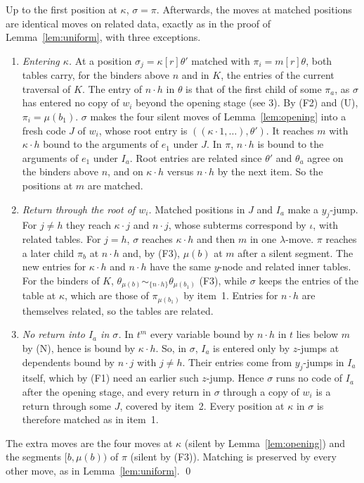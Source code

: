 \documentclass[11pt]{article}
\newcommand{\suc}[2]{#1{\cdot}#2}
\theoremstyle{plain}
\theoremstyle{definition}
\theoremstyle{remark}
\begin{document}
Up to the first position at $\kappa$, $\sigma=\pi$.  Afterwards, the
moves at matched positions are identical moves on related data, exactly
as in the proof of Lemma~\ref{lem:uniform}, with three exceptions.
\begin{enumerate}
\item \emph{Entering $\kappa$.}  At a position $\sigma_j=\kappa[r]\theta'$
  matched with $\pi_i=m[r]\theta$, both tables carry, for the binders
  above $n$ and in $K$, the entries of the current traversal of $K$.  The
  entry of $\suc nh$ in $\theta$ is that of the first child of some
  $\pi_a$, as $\sigma$ has entered no copy of $w_i$ beyond the opening
  stage (see 3).  By (F2) and (U), $\pi_i=\mu(b_1)$.  $\sigma$ makes the
  four silent moves of Lemma~\ref{lem:opening} into a fresh code $J$ of
  $w_i$, whose root entry is $((\suc\kappa1,\dots),\theta')$.  It
  reaches $m$ with $\suc\kappa h$ bound to the arguments of $e_1$ under
  $J$.  In $\pi$, $\suc nh$ is bound to the arguments of $e_1$ under
  $I_a$.  Root entries are related since $\theta'$ and $\theta_a$ agree on
  the binders above $n$, and on $\suc\kappa h$ versus $\suc nh$ by the
  next item.  So the positions at $m$ are matched.
\item \emph{Return through the root of $w_i$.}  Matched positions in $J$
  and $I_a$ make a $y_j$-jump.  For $j\ne h$ they reach $\suc\kappa j$ and
  $\suc nj$, whose subterms correspond by $\iota$, with related tables.
  For $j=h$, $\sigma$ reaches $\suc\kappa h$ and then $m$ in one
  $\lambda$-move.  $\pi$ reaches a later child $\pi_b$ at $\suc nh$ and,
  by (F3), $\mu(b)$ at $m$ after a silent segment.  The new entries for
  $\suc\kappa h$ and $\suc nh$ have the same $y$-node and related inner
  tables.  For the binders of $K$, $\theta_{\mu(b)}\sim_{\{\suc
  nh\}}\theta_{\mu(b_1)}$ (F3), while $\sigma$ keeps the entries of the
  table at $\kappa$, which are those of $\pi_{\mu(b_1)}$ by item~1.
  Entries for $\suc nh$ are themselves related, so the tables are
  related.
\item \emph{No return into $I_a$ in $\sigma$.}  In $t^m$ every variable
  bound by $\suc nh$ in $t$ lies below $m$ by (N), hence is bound by
  $\suc\kappa h$.  So, in $\sigma$, $I_a$ is entered only by $z$-jumps at
  dependents bound by $\suc nj$ with $j\ne h$.  Their entries come from
  $y_j$-jumps in $I_a$ itself, which by (F1) need an earlier such
  $z$-jump.  Hence $\sigma$ runs no code of $I_a$ after the opening
  stage, and every return in $\sigma$ through a copy of $w_i$ is a return
  through some $J$, covered by item~2.  Every position at $\kappa$ in
  $\sigma$ is therefore matched as in item~1.
\end{enumerate}
The extra moves are the four moves at $\kappa$ (silent by
Lemma~\ref{lem:opening}) and the segments $[b,\mu(b))$ of $\pi$ (silent
by (F3)).  Matching is preserved by every other move, as in
Lemma~\ref{lem:uniform}.  \qed
\end{document}
